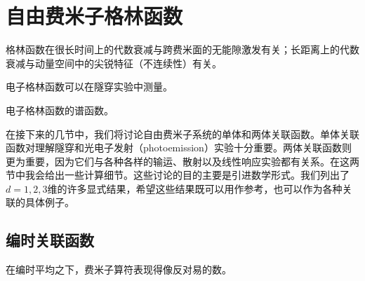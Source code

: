 \section{自由费米子格林函数}

\begin{keypoints}
\item 格林函数在很长时间上的代数衰减与跨费米面的无能隙激发有关；长距离上的代数衰减与动量空间中的尖锐特征（不连续性）有关。
\item 电子格林函数可以在隧穿实验中测量。
\item 电子格林函数的谱函数。
\end{keypoints}

在接下来的几节中，我们将讨论自由费米子系统的单体和两体关联函数。单体关联函数对理解隧穿和光电子发射（photoemission）实验十分重要。两体关联函数则更为重要，因为它们与各种各样的输运、散射以及线性响应实验都有关系。在这两节中我会给出一些计算细节。这些讨论的目的主要是引进数学形式。我们列出了$d=1,2,3$维的许多显式结果，希望这些结果既可以用作参考，也可以作为各种关联的具体例子。

\subsection{编时关联函数}

\begin{keypoints}
\item 在编时平均之下，费米子算符表现得像反对易的数。
\end{keypoints}

